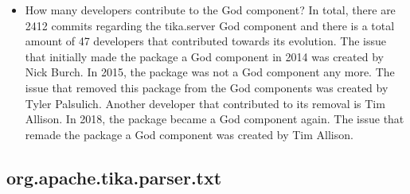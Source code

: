 \documentclass{article}
\begin{document}
\begin{itemize}
    \item How many developers contribute to the God component?
    In total, there are 2412 commits regarding the tika.server God component and there is a total amount of 47 developers that contributed towards its evolution. The issue that initially made the package a God component in 2014 was created by Nick Burch. %
    In 2015, the package was not a God component any more. The issue that removed this package from the God components was created by Tyler Palsulich. Another developer that contributed to its removal is Tim Allison. In 2018, the package became a God component again. The issue that remade the package a God component was created by Tim Allison. %


\end{itemize}


\subsection{org.apache.tika.parser.txt}
\end{document}
